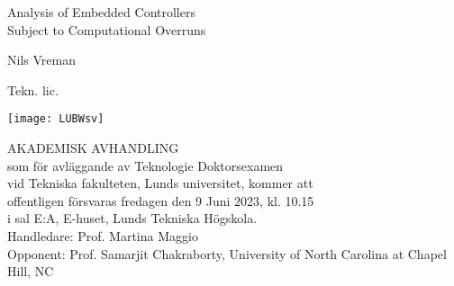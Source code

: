\documentclass[]{pm}
\begin{document}
\thispagestyle{empty}
\begin{centering}
\vspace*{35mm}
\sffamily\Huge
    Analysis of Embedded Controllers\\Subject to Computational Overruns
\par\vspace{20mm}  

\Large
Nils Vreman
\par\rmfamily\large
Tekn. lic.
  
\vfill
\texttt{[image: LUBWsv]}

\vspace{1cm}
\normalsize\rmfamily
AKADEMISK AVHANDLING\\[6pt]
som för avläggande av Teknologie Doktorsexamen\\
vid Tekniska fakulteten, Lunds universitet, kommer att  \\
offentligen försvaras fredagen den 9 Juni 2023, kl. 10.15\\
i sal E:A, E-huset, Lunds Tekniska Högskola.\\
Handledare: Prof. Martina Maggio\\
Opponent:   Prof. Samarjit Chakraborty, University of North Carolina at Chapel Hill, NC\\

\end{centering}
\end{document}
